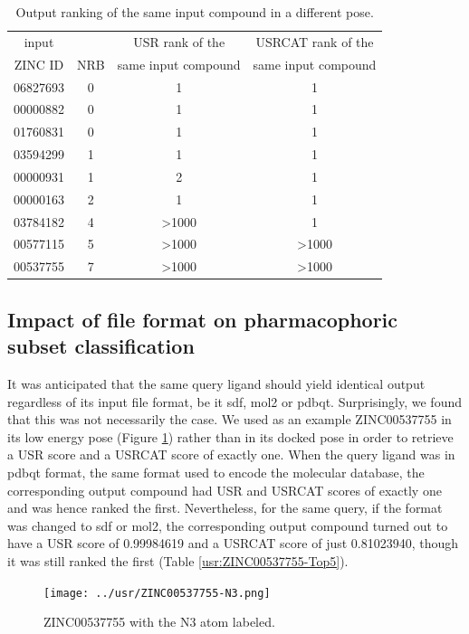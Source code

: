 \begin{table}
\caption{Output ranking of the same input compound in a different pose.}
\label{usr:RecoveryRate}
\begin{tabular}{cccc}
\hline
input    &     & USR rank of the     & USRCAT rank of the\\
ZINC ID  & NRB & same input compound & same input compound\\
\hline
06827693 &   0 &     1 &     1\\
00000882 &   0 &     1 &     1\\
01760831 &   0 &     1 &     1\\
03594299 &   1 &     1 &     1\\
00000931 &   1 &     2 &     1\\
00000163 &   2 &     1 &     1\\
03784182 &   4 & >1000 &     1\\
00577115 &   5 & >1000 & >1000\\
00537755 &   7 & >1000 & >1000\\
\hline
\end{tabular}
\end{table}

\subsection{Impact of file format on pharmacophoric subset classification}

It was anticipated that the same query ligand should yield identical output regardless of its input file format, be it sdf, mol2 or pdbqt. Surprisingly, we found that this was not necessarily the case. We used as an example ZINC00537755 in its low energy pose (Figure \ref{usr:ZINC00537755-N3}) rather than in its docked pose in order to retrieve a USR score and a USRCAT score of exactly one. When the query ligand was in pdbqt format, the same format used to encode the molecular database, the corresponding output compound had USR and USRCAT scores of exactly one and was hence ranked the first. Nevertheless, for the same query, if the format was changed to sdf or mol2, the corresponding output compound turned out to have a USR score of 0.99984619 and a USRCAT score of just 0.81023940, though it was still ranked the first (Table \ref{usr:ZINC00537755-Top5}).

\begin{figure}
\centering
\texttt{[image: ../usr/ZINC00537755-N3.png]}
\caption{ZINC00537755 with the N3 atom labeled.}
\label{usr:ZINC00537755-N3}
\end{figure}

